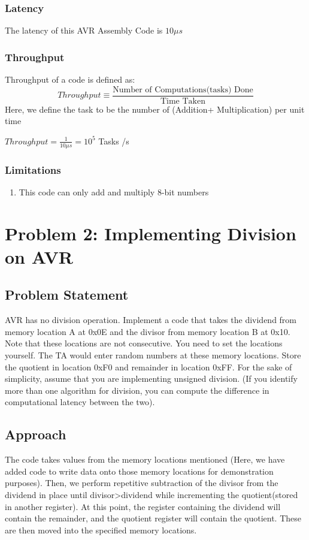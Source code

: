 \documentclass[titlepage, 11pt]{article}
\begin{document}
\subsubsection{Latency}
The latency of this AVR Assembly Code is $10 \mu s$

\subsubsection{Throughput}
Throughput of a code is defined as:
$$ Throughput \equiv \frac{\text{Number of Computations(tasks) Done}}{\text{Time Taken}}$$
Here, we define the task to be the number of (Addition+ Multiplication) per unit time

$Throughput= \frac{1}{10\mu s}=10^{5}$ Tasks /s

\subsubsection{Limitations}
\begin{enumerate}
\item This code can only add and multiply 8-bit numbers
\end{enumerate}


\section{Problem 2: Implementing Division on AVR}

\subsection{Problem Statement}
AVR has no division operation. Implement a code that takes the dividend from memory location A at 0x0E and the divisor from memory location B at 0x10. Note that these locations are not consecutive. You need to set the locations yourself. The TA would enter random numbers at these memory locations. Store the quotient in location 0xF0 and remainder in location 0xFF. For the sake of simplicity, assume that you are implementing unsigned division. (If you identify more than one algorithm for division, you can compute the difference in computational latency between the two).

\subsection{Approach}
The code takes values from the memory locations mentioned (Here, we have added code to write data onto those memory locations for demonstration purposes). Then, we perform repetitive subtraction of the divisor from the dividend in place until divisor>dividend while incrementing the quotient(stored in another register). At this point, the register containing the dividend will contain the remainder, and the quotient register will contain the quotient. These are then moved into the specified memory locations.
\end{document}
